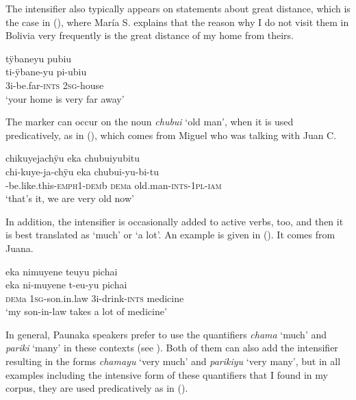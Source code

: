 \hspace*{-2.1pt}The intensifier also typically appears on statements about great distance, which is the case in (), where María S. explains that the reason why I do not visit them in Bolivia very frequently is the great distance of my home from theirs.

\ea\label{ex:yu-far}
\begingl
\glpreamble tÿbaneyu pubiu\\
\gla ti-ÿbane-yu pi-ubiu\\
\glb 3i-be.far-\textsc{ints} 2\textsc{sg}-house\\
\glft ‘your home is very far away’
\endgl
\trailingcitation{[rxx-e120511l.214]}
\xe



The marker can occur on the noun \textit{chubui} ‘old man’, when it is used predicatively, as in (), which comes from Miguel who was talking with Juan C.

\ea\label{ex:chubuiyu}
\begingl
\glpreamble chikuyejachÿu eka chubuiyubitu\\
\gla chi-kuye-ja-chÿu eka chubui-yu-bi-tu\\
-be.like.this-\textsc{emph}1-\textsc{dem}b \textsc{dem}a old.man-\textsc{ints}-1\textsc{pl}-\textsc{iam}\\
\glft ‘that’s it, we are very old now’
\endgl
\trailingcitation{[mqx-p110826l.343]}
\xe

In addition, the intensifier is occasionally added to active verbs, too, and then it is best translated as ‘much’ or ‘a lot’. An example is given in (). It comes from Juana.

\ea\label{ex:yu-ACT}
\begingl
\glpreamble eka nimuyene teuyu pichai\\
\gla eka ni-muyene t-eu-yu pichai\\
\glb \textsc{dem}a 1\textsc{sg}-son.in.law 3i-drink-\textsc{ints} medicine\\
\glft ‘my son-in-law takes a lot of medicine’
\endgl
\trailingcitation{[jxx-p110923l-1.050]}
\xe

In general, Paunaka speakers prefer to use the quantifiers \textit{chama} ‘much’ and \textit{pariki} ‘many’ in these contexts (see ). Both of them can also add the intensifier resulting in the forms \textit{chamayu} ‘very much’ and \textit{parikiyu} ‘very many’, but in all examples including the intensive form of these quantifiers that I found in my corpus, they are used predicatively as in ().

